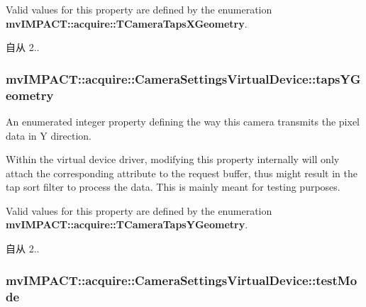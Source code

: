 Valid values for this property are defined by the enumeration {\bfseries mv\+I\+M\+P\+A\+C\+T\+::acquire\+::\+T\+Camera\+Taps\+X\+Geometry}. \begin{DoxySince}{自从}
2.. 
\end{DoxySince}
\hypertarget{classmv_i_m_p_a_c_t_1_1acquire_1_1_camera_settings_virtual_device_af9547245a868b5fb47a0f8591b4b5408}{
\subsubsection[{taps\+Y\+Geometry}]{ mv\+I\+M\+P\+A\+C\+T\+::acquire\+::\+Camera\+Settings\+Virtual\+Device\+::taps\+Y\+Geometry}}\label{classmv_i_m_p_a_c_t_1_1acquire_1_1_camera_settings_virtual_device_af9547245a868b5fb47a0f8591b4b5408}


An enumerated integer property defining the way this camera transmits the pixel data in Y direction. 

Within the virtual device driver, modifying this property internally will only attach the corresponding attribute to the request buffer, thus might result in the tap sort filter to process the data. This is mainly meant for testing purposes.

Valid values for this property are defined by the enumeration {\bfseries mv\+I\+M\+P\+A\+C\+T\+::acquire\+::\+T\+Camera\+Taps\+Y\+Geometry}. \begin{DoxySince}{自从}
2.. 
\end{DoxySince}
\hypertarget{classmv_i_m_p_a_c_t_1_1acquire_1_1_camera_settings_virtual_device_a804a5ef868aaf896d39986547d8407f6}{
\subsubsection[{test\+Mode}]{ mv\+I\+M\+P\+A\+C\+T\+::acquire\+::\+Camera\+Settings\+Virtual\+Device\+::test\+Mode}}\label{classmv_i_m_p_a_c_t_1_1acquire_1_1_camera_settings_virtual_device_a804a5ef868aaf896d39986547d8407f6}



